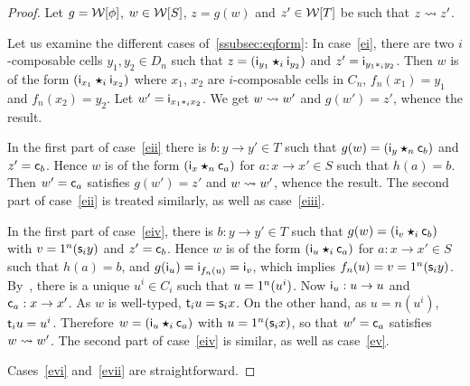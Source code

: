  \begin{proof}
   Let $g=\mathcal{W}[\phi]$, $w\in\mathcal{W}[S]$, $z=g(w)$ and $z'\in\mathcal{W}[T]$ be such that
   $z\leadsto z'$.

   Let us examine the different cases of~\ref{ssubsec:eqform}:
  In case~\ref{ei}, there are two $i$-composable cells $y_1,y_2\in D_n$ such that
  $z=(\mathsf{i}_{y_1}\bm{\star}_{i} \mathsf{i}_{y_2})$ and $z'=\mathsf{i}_{y_1\ast_{i}
    y_2}$. Then $w$ is of the form $(\mathsf{i}_{x_1}\bm{\star}_{i}\mathsf{i}_{x_2})$ where
  $x_1$, $x_2$ are $i$-composable cells in $C_n$,
  $f_n(x_1)=y_1$ and $f_n(x_2)=y_2$. Let $w'=\mathsf{i}_{x_1\ast_{i}
    x_2}$. We get $w\leadsto w'$ and $g(w')=z'$, whence the result.
  
In the first part of case~\ref{eii}  there is $b:y\to y'\in T$ such that $g(w)=(\mathsf{i}_{y}\bm{\star}_{n}
\mathsf{c}_{b})$ and $z'=\mathsf{c}_{b}$. Hence $w$ is of the form $(\mathsf{i}_{x}\bm{\star}_{n}\mathsf{c}_{a})$ for
$a:x\to x'\in S$ such that $h(a)=b$. Then $w'=\mathsf{c}_{a}$ satisfies
$g(w')=z'$ and $w\leadsto w'$, whence the result.
The second part of case~\ref{eii} is treated similarly, as well as
case~\ref{eiii}.

In the first part of case~\ref{eiv}, there is $b:y\to y'\in T$ such that
$g(w)=(\mathsf{i}_{v}\bm{\star}_{i} \mathsf{c}_{b})$ with $v=1^{n}(\mathsf{s}_{i} y)$ and
$z'=\mathsf{c}_{b}$. Hence $w$ is of the form $(\mathsf{i}_{u}\bm{\star}_{i}\mathsf{c}_{a})$ for
$a:x\to x'\in S$ such that $h(a)=b$, and $g(\mathsf{i}_{u})=\mathsf{i}_{f_n(u)}=\mathsf{i}_{v}$, which implies $f_n(u)=v=1^{n}(\mathsf{s}_{i} y)$. By~\cndi, there is a unique
$u^i\in C_i$ such that $u=1^{n}(u^i)$. Now $\mathsf{i}_{u}:u\to u$ and
$\mathsf{c}_{a}:x\to x'$. As $w$
is well-typed, $\mathsf{t}_{i} u=\mathsf{s}_{i} x$. On the other hand, as
$u=\unit{n}(u^i)$, $\mathsf{t}_{i} u=u^i$. Therefore $w=(\mathsf{i}_{u}\bm{\star}_{i} \mathsf{c}_{a})$
with $u=1^{n}(\mathsf{s}_{i} x)$, so that $w'=\mathsf{c}_{a}$ satisfies $w\leadsto
w'$. The second part of case~\ref{eiv} is similar, as well as case~\ref{ev}.

Cases~\ref{evi} and~\ref{evii} are straightforward.


\end{proof}

